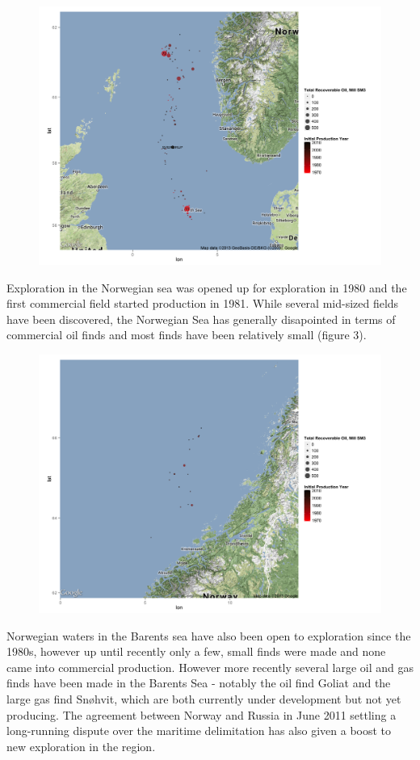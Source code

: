 \documentclass[12pt]{scrartcl} %
\begin{document}
\begin{figure}
\includegraphics[width=.8\textwidth]{north_sea_reserves.png}
\end{figure}

Exploration in the Norwegian sea was opened up for exploration in 1980 and the first commercial field started production in 1981.  While several mid-sized fields have been discovered, the Norwegian Sea has generally disapointed in terms of commercial oil finds and most finds have been relatively small (figure 3).  
\begin{figure}
\includegraphics[width=.8\textwidth]{norwegian_sea_reserves.png}
\end{figure}
Norwegian waters in the Barents sea have also been open to exploration since the 1980s, however up until recently only a few, small finds were made and none came into commercial production.  However more recently several large oil and gas finds have been made in the Barents Sea - notably the oil find Goliat and the large gas find Snøhvit, which are both currently under development but not yet producing.  The agreement between Norway and Russia in June 2011 settling a long-running dispute over the maritime delimitation has also given a boost to new exploration in the region.  
\end{document}
